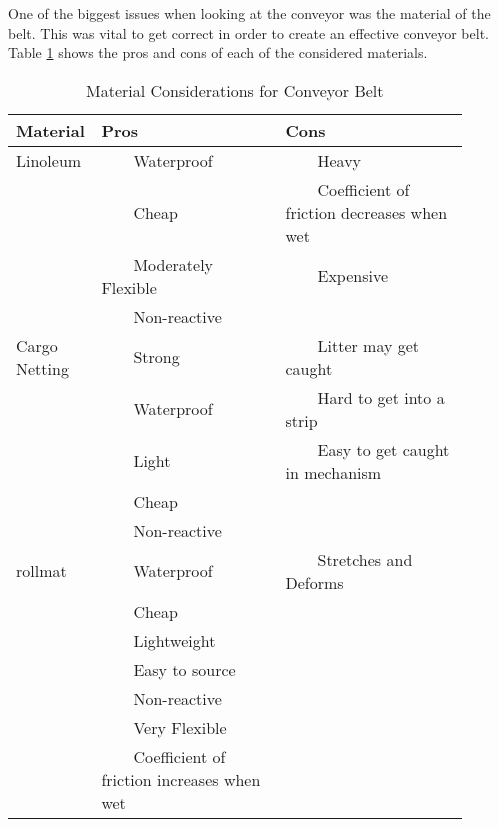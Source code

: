 \documentclass [11pt]{article}
\newcommand{\tabitem}{~~\llap{\textbullet}~~}
\begin{document}
One of the biggest issues when looking at the conveyor was the material of the belt. This was vital to get correct in order to create an effective conveyor belt. Table \ref{table:conveyor_materials} shows the pros and cons of each of the considered materials. 

\begin{table}[H]
\centering
\setlength{\arrayrulewidth}{1.5pt}
\begin{tabular}{|p{0.1\linewidth}|p{0.4\linewidth}|p{0.4\linewidth}|}
\hline
\cellcolor{gray!40} Material & \cellcolor{gray!40}Pros & \cellcolor{gray!40} Cons \\ 
\hline
\cellcolor{gray!20} Linoleum & \cellcolor{gray!20} \tabitem Waterproof & \cellcolor{gray!20} \tabitem Heavy\\
\cellcolor{gray!20}  & \cellcolor{gray!20} \tabitem Cheap & \cellcolor{gray!20} \tabitem Coefficient of friction decreases when wet \\
\cellcolor{gray!20}  & \cellcolor{gray!20} \tabitem Moderately Flexible & \cellcolor{gray!20} \tabitem Expensive \\
\cellcolor{gray!20}  & \cellcolor{gray!20} \tabitem Non-reactive & \cellcolor{gray!20} \\
\hline
\cellcolor{gray!20} Cargo Netting & \cellcolor{gray!20} \tabitem Strong & \cellcolor{gray!20} \tabitem Litter may get caught\\
\cellcolor{gray!20}  & \cellcolor{gray!20} \tabitem Waterproof & \cellcolor{gray!20} \tabitem Hard to get into a strip \\
\cellcolor{gray!20}  & \cellcolor{gray!20} \tabitem Light & \cellcolor{gray!20} \tabitem Easy to get caught in mechanism \\
\cellcolor{gray!20}  & \cellcolor{gray!20} \tabitem Cheap & \cellcolor{gray!20} \\
\cellcolor{gray!20}  & \cellcolor{gray!20} \tabitem Non-reactive & \cellcolor{gray!20} \\
\hline
\cellcolor{gray!20} \gls{rollmat} & \cellcolor{gray!20} \tabitem Waterproof & \cellcolor{gray!20} \tabitem Stretches and Deforms\\
\cellcolor{gray!20}  & \cellcolor{gray!20} \tabitem Cheap & \cellcolor{gray!20} \\
\cellcolor{gray!20}  & \cellcolor{gray!20} \tabitem Lightweight & \cellcolor{gray!20} \\
\cellcolor{gray!20}  & \cellcolor{gray!20} \tabitem Easy to source & \cellcolor{gray!20} \\
\cellcolor{gray!20}  & \cellcolor{gray!20} \tabitem Non-reactive & \cellcolor{gray!20} \\
\cellcolor{gray!20}  & \cellcolor{gray!20} \tabitem Very Flexible & \cellcolor{gray!20} \\
\cellcolor{gray!20}  & \cellcolor{gray!20} \tabitem Coefficient of friction increases when wet & \cellcolor{gray!20} \\
\hline
\end{tabular}
\caption{Material Considerations for Conveyor Belt}
\label{table:conveyor_materials}
\end{table} 
\end{document}
